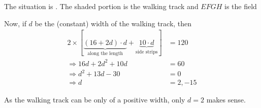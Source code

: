 \begin{solution}[\halfpage]
  The situation is \asif. The shaded portion is the walking track and $EFGH$ is the field

  Now, if $d$ be the (constant) width of the walking track, then
  \begin{align}
  	2\times\left[\underbrace{(16+2d)\cdot d}_{\text{along the length}} + 
  	\underbrace{10\cdot d}_{\text{side strips}} \right] &= 120 \\
  	\Rightarrow 16d + 2d^2 + 10d &= 60 \\
  	\Rightarrow d^2 + 13d - 30 &= 0 \\
  	\Rightarrow d &= 2, -15
  \end{align}
  
  As the walking track  can be only of a positive width, only $d = 2$ makes sense. 
\end{solution}

